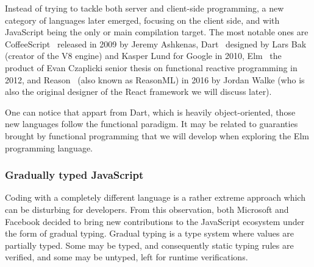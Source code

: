 Instead of trying to tackle both server and client-side programming,
a new category of languages later emerged, focusing on the client side,
and with JavaScript being the only or main compilation target.
The most notable ones are CoffeeScript~\cite{coffeescript} released in 2009
by Jeremy Ashkenas, Dart~\cite{dart-blog} designed by Lars Bak
(creator of the V8 engine) and Kasper Lund for Google in 2010,
Elm~\cite{czaplicki2013asynchronous} the product of Evan Czaplicki senior thesis
on functional reactive programming in 2012,
and Reason~\cite{reason} (also known as ReasonML) in 2016 by Jordan Walke (who is
also the original designer of the React framework we will discuss later).

One can notice that appart from Dart, which is heavily object-oriented,
those new languages follow the functional paradigm.
It may be related to guaranties brought by functional programming
that we will develop when exploring the Elm programming language.


\subsubsection{Gradually typed JavaScript}%
\label{ssub:gradually_typed_javascript}

Coding with a completely different language is a rather extreme approach
which can be disturbing for developers.
From this observation, both Microsoft and Facebook decided to bring
new contributions to the JavaScript ecosystem under the form of gradual typing.
Gradual typing is a type system where values are partially typed.
Some may be typed, and consequently static typing rules are verified,
and some may be untyped, left for runtime verifications.


